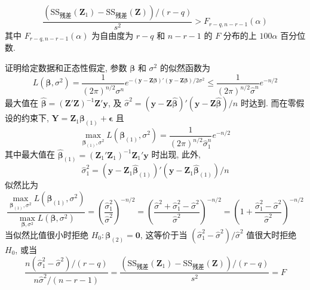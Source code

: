 \[
\frac{(\text{SS}_{\text{残差}}(\mathbf{Z}_1)-\text{SS}_{\text{残差}}(\mathbf{Z}))/(r-q)}{s^2}>F_{r-q,n-r-1}(\alpha)
\]
其中 $F_{r-q,n-r-1}(\alpha)$ 为自由度为 $r-q$ 和 $n-r-1$ 的 $F$ 分布的上 $100\alpha$ 百分位数.

证明\quad 给定数据和正态性假定, 参数 $\boldsymbol{\beta}$ 和 $\sigma^2$ 的似然函数为
\[
L(\boldsymbol{\beta},\sigma^2)=\frac{1}{(2\pi)^{n/2}\sigma^n}e^{-(\mathbf{y}-\mathbf{Z}\boldsymbol{\beta})'(\mathbf{y}-\mathbf{Z}\boldsymbol{\beta})/2\sigma^2}
\leq\frac{1}{(2\pi)^{n/2}\hat{\sigma}^n}e^{-n/2}
\]
最大值在 $\hat{\boldsymbol{\beta}}=(\mathbf{Z}'\mathbf{Z})^{-1}\mathbf{Z}'\mathbf{y}$, 及 $\hat{\sigma}^2=(\mathbf{y}-\mathbf{Z}\hat{\boldsymbol{\beta}})'(\mathbf{y}-\mathbf{Z}\hat{\boldsymbol{\beta}})/n$ 时达到. 而在零假设的约束下, $\mathbf{Y}=\mathbf{Z}_1\boldsymbol{\beta}_{(1)}+\boldsymbol{\epsilon}$ 且
\[
\max_{\boldsymbol{\beta}_{(1)},\sigma^2}L(\boldsymbol{\beta}_{(1)},\sigma^2)=\frac{1}{(2\pi)^{n/2}\hat{\sigma}_1^n}e^{-n/2}
\]
其中最大值在 $\hat{\boldsymbol{\beta}}_{(1)}=(\mathbf{Z}_1'\mathbf{Z}_1)^{-1}\mathbf{Z}_1'\mathbf{y}$ 时出现, 此外,
\[
\hat{\sigma}_1^2=(\mathbf{y}-\mathbf{Z}_1\hat{\boldsymbol{\beta}}_{(1)})'(\mathbf{y}-\mathbf{Z}_1\hat{\boldsymbol{\beta}}_{(1)})/n
\]
似然比为
\[
\frac{\max\limits_{\boldsymbol{\beta}_{(1)},\sigma^2}L(\boldsymbol{\beta}_{(1)},\sigma^2)}{\max\limits_{\boldsymbol{\beta},\sigma^2}L(\boldsymbol{\beta},\sigma^2)}
=\left(\frac{\hat{\sigma}_1^2}{\hat{\sigma}^2}\right)^{-n/2}
=\left(\frac{\hat{\sigma}^2+\hat{\sigma}_1^2-\hat{\sigma}^2}{\hat{\sigma}^2}\right)^{-n/2}
=\left(1+\frac{\hat{\sigma}_1^2-\hat{\sigma}^2}{\hat{\sigma}^2}\right)^{-n/2}
\]
当似然比值很小时拒绝 $H_0:\boldsymbol{\beta}_{(2)}=\mathbf{0}$, 这等价于当 $(\hat{\sigma}_1^2-\hat{\sigma}^2)/\hat{\sigma}^2$ 值很大时拒绝 $H_0$, 或当
\[
\frac{n(\hat{\sigma}_1^2-\hat{\sigma}^2)/(r-q)}{n\hat{\sigma}^2/(n-r-1)}
=\frac{(\text{SS}_{\text{残差}}(\mathbf{Z}_1)-\text{SS}_{\text{残差}}(\mathbf{Z}))/(r-q)}{s^2}=F
\]
